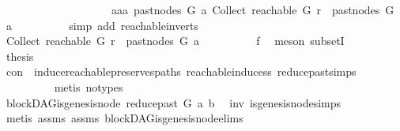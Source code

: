\begin{isabellebody}
\ \ \ \ \ \ \ \ \ \ \ \ \ \ \ \ \ \ \ {\isasymor}\ aaa\ {\isacharparenleft}{\kern0pt}past{\isacharunderscore}{\kern0pt}nodes\ G\ a{\isacharparenright}{\kern0pt}\ {\isacharparenleft}{\kern0pt}Collect\ {\isacharparenleft}{\kern0pt}reachable\ G\ r{\isacharparenright}{\kern0pt}{\isacharparenright}{\kern0pt}\ {\isasymin}\ past{\isacharunderscore}{\kern0pt}nodes\ G\ a{\isachardoublequoteclose}\isanewline
\ \ \ \ \ \ \ \ \isamarkupfalse%
\ {\isacharparenleft}{\kern0pt}simp\ add{\isacharcolon}{\kern0pt}\ reachable{\isacharunderscore}{\kern0pt}in{\isacharunderscore}{\kern0pt}verts{\isacharparenleft}{\kern0pt}{}{\isacharparenright}{\kern0pt}{\isacharparenright}{\kern0pt}\isanewline
\ \ \ \ \ \ \isamarkupfalse%
\ \isamarkupfalse%
\ {\isachardoublequoteopen}Collect\ {\isacharparenleft}{\kern0pt}reachable\ G\ r{\isacharparenright}{\kern0pt}\ {\isasymsubseteq}\ past{\isacharunderscore}{\kern0pt}nodes\ G\ a{\isachardoublequoteclose}\isanewline
\ \ \ \ \ \ \ \ \isamarkupfalse%
\ f{}\ \isamarkupfalse%
\ {\isacharparenleft}{\kern0pt}meson\ subsetI{\isacharparenright}{\kern0pt}\isanewline
\ \ \ \ \ \ \isamarkupfalse%
\ \isamarkupfalse%
\ {\isacharquery}{\kern0pt}thesis\isanewline
\ \ \ \ \ \ \ \ \isamarkupfalse%
\ con\ \ induce{\isacharunderscore}{\kern0pt}reachable{\isacharunderscore}{\kern0pt}preserves{\isacharunderscore}{\kern0pt}paths\ reachable{\isacharunderscore}{\kern0pt}induce{\isacharunderscore}{\kern0pt}ss\ reduce{\isacharunderscore}{\kern0pt}past{\isachardot}{\kern0pt}simps\isanewline
\ \ \ \ \ \ \ \ \isamarkupfalse%
\ {\isacharparenleft}{\kern0pt}metis\ {\isacharparenleft}{\kern0pt}no{\isacharunderscore}{\kern0pt}types{\isacharparenright}{\kern0pt}{\isacharparenright}{\kern0pt}\isanewline
\ \ \ \ \isamarkupfalse%
\isanewline
\ \ \isamarkupfalse%
\isanewline
\ \ \isamarkupfalse%
\ \isamarkupfalse%
\ {\isachardoublequoteopen}blockDAG{\isachardot}{\kern0pt}is{\isacharunderscore}{\kern0pt}genesis{\isacharunderscore}{\kern0pt}node\ {\isacharparenleft}{\kern0pt}reduce{\isacharunderscore}{\kern0pt}past\ G\ a{\isacharparenright}{\kern0pt}\ b{\isachardoublequoteclose}\ \isamarkupfalse%
\ inv\ is{\isacharunderscore}{\kern0pt}genesis{\isacharunderscore}{\kern0pt}node{\isachardot}{\kern0pt}simps\isanewline
\ \ \ \ \isamarkupfalse%
\ {\isacharparenleft}{\kern0pt}metis\ assms{\isacharparenleft}{\kern0pt}{}{\isacharparenright}{\kern0pt}\ assms{\isacharparenleft}{\kern0pt}{}{\isacharparenright}{\kern0pt}\ blockDAG{\isachardot}{\kern0pt}is{\isacharunderscore}{\kern0pt}genesis{\isacharunderscore}{\kern0pt}node{\isachardot}{\kern0pt}elims{\isacharparenleft}{\kern0pt}{}{\isacharparenright}{\kern0pt}\isanewline

\end{isabellebody}
